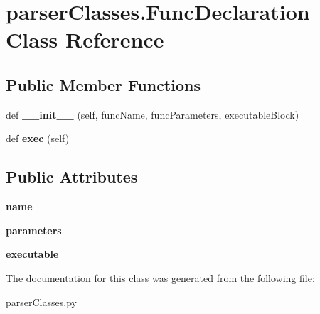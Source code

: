 \hypertarget{classparser_classes_1_1_func_declaration}{}\section{parser\+Classes.\+Func\+Declaration Class Reference}
\label{classparser_classes_1_1_func_declaration}
\subsection*{Public Member Functions}
\begin{DoxyCompactItemize}
\item 
def {\bfseries \+\_\+\+\_\+init\+\_\+\+\_\+} (self, func\+Name, func\+Parameters, executable\+Block)\hypertarget{classparser_classes_1_1_func_declaration_a50e9ecdc3fe856094568e57e1697fa0c}{}\label{classparser_classes_1_1_func_declaration_a50e9ecdc3fe856094568e57e1697fa0c}

\item 
def {\bfseries exec} (self)\hypertarget{classparser_classes_1_1_func_declaration_a8ced5ff33d2344764037ad60034e8021}{}\label{classparser_classes_1_1_func_declaration_a8ced5ff33d2344764037ad60034e8021}

\end{DoxyCompactItemize}
\subsection*{Public Attributes}
\begin{DoxyCompactItemize}
\item 
{\bfseries name}\hypertarget{classparser_classes_1_1_func_declaration_a0819b3ffd946ed4915fed296aab72177}{}\label{classparser_classes_1_1_func_declaration_a0819b3ffd946ed4915fed296aab72177}

\item 
{\bfseries parameters}\hypertarget{classparser_classes_1_1_func_declaration_ae737822ca3c55f6bacf6985562e41d94}{}\label{classparser_classes_1_1_func_declaration_ae737822ca3c55f6bacf6985562e41d94}

\item 
{\bfseries executable}\hypertarget{classparser_classes_1_1_func_declaration_a0b6e461c4b0fefe197311830468874fa}{}\label{classparser_classes_1_1_func_declaration_a0b6e461c4b0fefe197311830468874fa}

\end{DoxyCompactItemize}


The documentation for this class was generated from the following file\+:\begin{DoxyCompactItemize}
\item 
parser\+Classes.\+py\end{DoxyCompactItemize}
